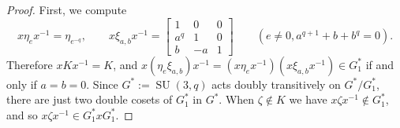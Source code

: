 \begin{proof}
First, we compute
\begin{equation}
\label{eq:PSUrelx}
x \eta_e x^{-1}
=
\eta_{e^{-q}},
\qquad
x \xi_{a,b} x^{-1} = \begin{bmatrix} 1 & 0 & 0 \\ a^q & 1 & 0 \\ b & -a & 1 \end{bmatrix}
\qquad
(e \neq 0, a^{q+1} + b + b^q = 0).
\end{equation}
Therefore $xKx^{-1} = K$, and $x(\eta_e \xi_{a,b})x^{-1} = (x\eta_ex^{-1}) (x\xi_{a,b}x^{-1}) \in G_1^*$ if and only if $a=b=0$.
Since $G^* := \operatorname{SU}(3,q)$ acts doubly transitively on $G^*/G_1^*$, there are just two double cosets of $G_1^*$ in $G^*$.
When $\zeta \notin K$ we have $x \zeta x^{-1} \notin G_1^*$, and so $x \zeta x^{-1} \in G_1^* x G_1^*$.


\end{proof}
